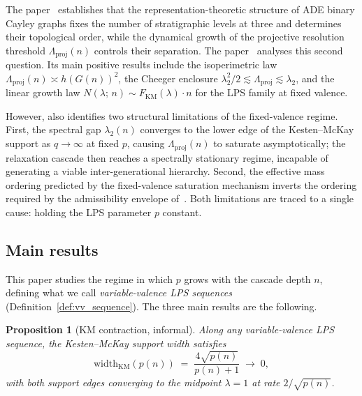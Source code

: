 \documentclass[11pt]{article}
\newtheorem*{proposition*}{Proposition}
\newcommand{\Lproj}{\Lambda_{\mathrm{proj}}}
\newcommand{\widthKM}{\mathrm{width}_{\mathrm{KM}}}
\newcommand{\FKM}{F_{\mathrm{KM}}}
\begin{document}
      The paper~\cite{Beau2026a4} establishes that the representation-theoretic
      structure of ADE binary Cayley graphs fixes the number of stratigraphic
      levels at three and determines their topological order, while the dynamical
      growth of the projective resolution threshold $\Lproj(n)$ controls their
      separation.
      The paper~\cite{Beau2026a5} analyses this second question.
      Its main positive results include the isoperimetric law
      $\Lproj(n) \asymp h(G(n))^2$, the Cheeger enclosure
      $\lambda_2^2/2 \lesssim \Lproj \lesssim \lambda_2$, and the linear growth
      law $N(\lambda;\,n) \sim \FKM(\lambda) \cdot n$ for the LPS family at fixed
      valence.

      However, \cite{Beau2026a5} also identifies two structural limitations of the
      fixed-valence regime.
      First, the spectral gap $\lambda_2(n)$ converges to the lower edge of the
      Kesten--McKay support as $q \to \infty$ at fixed $p$, causing $\Lproj(n)$ to
      saturate asymptotically; the relaxation cascade then reaches a spectrally
      stationary regime, incapable of generating a viable inter-generational
      hierarchy.
      Second, the effective mass ordering predicted by the fixed-valence saturation
      mechanism inverts the ordering required by the admissibility envelope
      of~\cite{Beau2026a4}.
      Both limitations are traced to a single cause: holding the LPS parameter $p$
      constant.

    \subsection{Main results}
      \label{subsec:results}

      This paper studies the regime in which $p$ grows with the cascade depth $n$,
      defining what we call \emph{variable-valence LPS sequences}
      (Definition~\ref{def:vv_sequence}).
      The three main results are the following.

      \begin{proposition*}[KM contraction, informal]
  Along any variable-valence LPS sequence, the Kesten--McKay support width
  satisfies
  \[
    \widthKM(p(n)) \;=\; \frac{4\sqrt{p(n)}}{p(n)+1} \;\longrightarrow\; 0,
  \]
  with both support edges converging to the midpoint $\lambda = 1$ at rate
  $2/\sqrt{p(n)}$.
      \end{proposition*}
\end{document}
